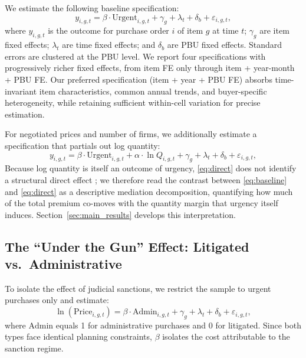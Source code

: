 We estimate the following baseline specification:
\begin{equation}
\label{eq:baseline}
y_{i,g,t} = \beta \cdot \text{Urgent}_{i,g,t} + \gamma_g + \lambda_t + \delta_b + \varepsilon_{i,g,t},
\end{equation}
where $y_{i,g,t}$ is the outcome for purchase order $i$ of item $g$ at time $t$; $\gamma_g$ are item fixed effects; $\lambda_t$ are time fixed effects; and $\delta_b$ are PBU fixed effects. Standard errors are clustered at the PBU level. We report four specifications with progressively richer fixed effects, from item FE only through item + year-month + PBU FE. Our preferred specification (item + year + PBU FE) absorbs time-invariant item characteristics, common annual trends, and buyer-specific heterogeneity, while retaining sufficient within-cell variation for precise estimation.

For negotiated prices and number of firms, we additionally estimate a specification that partials out log quantity:
\begin{equation}
\label{eq:direct}
y_{i,g,t} = \beta \cdot \text{Urgent}_{i,g,t} + \alpha \cdot \ln Q_{i,g,t} + \gamma_g + \lambda_t + \delta_b + \varepsilon_{i,g,t},
\end{equation}
Because log quantity is itself an outcome of urgency, \eqref{eq:direct} does not identify a structural direct effect \citep{acharya2016explaining}; we therefore read the contrast between \eqref{eq:baseline} and \eqref{eq:direct} as a descriptive mediation decomposition, quantifying how much of the total premium co-moves with the quantity margin that urgency itself induces. Section~\ref{sec:main_results} develops this interpretation.

\subsection{The ``Under the Gun'' Effect: Litigated vs.\ Administrative}

To isolate the effect of judicial sanctions, we restrict the sample to urgent purchases only and estimate:
\begin{equation}
\label{eq:utg}
\ln(\text{Price}_{i,g,t}) = \beta \cdot \text{Admin}_{i,g,t} + \gamma_g + \lambda_t + \delta_b + \varepsilon_{i,g,t},
\end{equation}
where $\text{Admin}$ equals 1 for administrative purchases and 0 for litigated. Since both types face identical planning constraints, $\beta$ isolates the cost attributable to the sanction regime.
